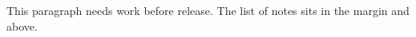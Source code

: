 \documentclass{article}
\begin{document}
This paragraph needs work before release.
The list of notes sits in the margin and above.
\end{document}
